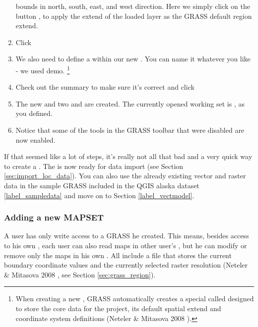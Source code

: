 \begin{enumerate}
  bounds in north, south, east, and west direction. Here we simply click on 
  the button , to apply the extend of the 
  loaded layer  as the GRASS default region extend.
  \item Click  
  \item We also need to define a  within our new 
  . You can name it whatever you like - we used demo.
  \footnote{When creating a new , GRASS automatically 
  creates a special  called  designed to 
  store the core data for the project, its default spatial extend and 
  coordinate system definitions (Neteler \& Mitasova 2008 
  \cite{neteler_mitasova08}).}
  \item Check out the summary to make sure it's correct and click
  \item The new  and two 
  and  are created. The currently opened working set is
  , as you defined.
  \item Notice that some of the tools in the GRASS toolbar that were 
  disabled are now enabled.
\end{enumerate}

If that seemed like a lot of steps, it's really not all that bad and a very 
quick way to create a . The  is 
now ready for data import (see Section \ref{sec:import_loc_data}).
You can also use the already existing vector and raster data in the sample 
GRASS  included in the QGIS alaska dataset 
\ref{label_sampledata} and move on to Section \ref{label_vectmodel}.

\subsubsection{Adding a new MAPSET}\label{sec:add_mapset}

A user has only write access to a GRASS  he created. This 
means, besides access to his own , each user can also read 
maps in other user's , but he can modify or remove only 
the maps in his own . All  include a 
 file that stores the current boundary coordinate values and 
the currently selected raster resolution (Neteler \& Mitasova 2008 
\cite{neteler_mitasova08}, see Section \ref{sec:grass_region}). 

